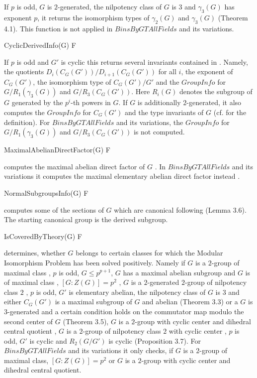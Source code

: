 If $p$ is odd, $G$ is $2$-generated, the nilpotency class of $G$ is $3$ and $\gamma_3(G)$ 
has exponent $p$, it returns the isomorphism types of $\gamma_2(G)$ and $\gamma_3(G)$
\cite{MS22}(Theorem 4.1). This function is not applied in $BinsByGTAllFields$ and its variations.

\> CyclicDerivedInfo(G) F

If $p$ is odd and $G'$ is cyclic this returns several invariants contained in \cite{GLdRS22} \cite{GLdR23}.
Namely, the quotients $D_i(C_G(G'))/D_{i+1}(C_G(G'))$ for all $i$, the exponent of $C_G(G')$, the isomorphism
type of $C_G(G')/G'$ and the $GroupInfo$ for $G/R_1(\gamma_3(G))$ and $G/R_3(C_G(G'))$.
Here $R_i(G)$ denotes the subgroup of $G$ generated by the $p^i$-th powers in $G$.
If $G$ is additionally $2$-generated, it also computes the $GroupInfo$ for $C_G(G')$ and the
type invariants of $G$ (cf. \cite{GLdRS22} for the definition). 
For $BinsByGTAllFields$ and its variations, the $GroupInfo$ for  $G/R_1(\gamma_3(G))$
 and $G/R_3(C_G(G'))$ is not computed.
 
\> MaximalAbelianDirectFactor(G) F

computes the maximal abelian direct factor of $G$ \cite{GL24}. In $BinsByGTAllFields$ and
its variations it computes the maximal elementary abelian direct factor instead \cite{MSS23}.

\> NormalSubgroupsInfo(G) F

computes some of the sections of $G$ which are canonical following \cite{GL24}(Lemma 3.6). The starting canonical group is the derived subgroup.

\> IsCoveredByTheory(G) F

determines, whether $G$ belongs to certain classes for which the Modular Isomorphism
Problem has been solved positively. Namely if $G$ is a $2$-group of maximal class \cite{Bag92},
$p$ is odd, $G \leq p^{p+1}$, $G$ has a maximal abelian subgroup and $G$ is of maximal class \cite{BC88},
$[G:Z(G)] = p^2$ \cite{Dre89}, $G$ is a $2$-generated $2$-group of nilpotency class $2$ \cite{BdR21},
$p$ is odd, $G'$ is elementary abelian, the nilpotency class of $G$ is $3$ and either 
$C_G(G')$ is a maximal subgroup of $G$ and abelian \cite{MS22}(Theorem 3.3) or a $G$ is
$3$-generated and a certain condition holds on the commutator map modulo the second center of $G$
\cite{MS22}(Theorem 3.5), $G$ is a $2$-group with cyclic center and dihedral central
quotient \cite{MSS23}, $G$ is a $2$-group of nilpotency class $2$ with cyclic center \cite{GLM24},
$p$ is odd, $G'$ is cyclic and $R_2(G/G')$ is cyclic \cite{GLdR23}(Proposition 3.7). 
For $BinsByGTAllFields$ and its variations it only checks, if $G$ is a $2$-group of
maximal class, $[G:Z(G)] = p^2$ or $G$ is a $2$-group with cyclic center and dihedral central
quotient.

